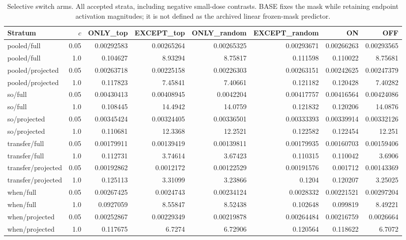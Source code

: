 \begin{table}[!ht]\centering\scriptsize
\setlength{\tabcolsep}{3pt}
\begin{tabular}{lrrrrrrr}\toprule
Stratum & $c$ & ONLY\_top & EXCEPT\_top & ONLY\_random & EXCEPT\_random & ON & OFF\\\midrule
pooled/full & 0.05 & 0.00292583 & 0.00265264 & 0.00265325 & 0.00293671 & 0.00266263 & 0.00293565\\
pooled/full & 1.0 & 0.104627 & 8.93294 & 8.75817 & 0.111598 & 0.110022 & 8.75681\\
pooled/projected & 0.05 & 0.00263718 & 0.00225158 & 0.00226303 & 0.00263151 & 0.00242625 & 0.00247379\\
pooled/projected & 1.0 & 0.117823 & 7.45841 & 7.40661 & 0.121182 & 0.120428 & 7.40282\\
so/full & 0.05 & 0.00430413 & 0.00408945 & 0.0042204 & 0.00417757 & 0.00416564 & 0.00424086\\
so/full & 1.0 & 0.108445 & 14.4942 & 14.0759 & 0.121832 & 0.120206 & 14.0876\\
so/projected & 0.05 & 0.00345424 & 0.00324405 & 0.00336501 & 0.00333393 & 0.00339914 & 0.00332126\\
so/projected & 1.0 & 0.110681 & 12.3368 & 12.2521 & 0.122582 & 0.122454 & 12.251\\
transfer/full & 0.05 & 0.00179911 & 0.00139419 & 0.00139811 & 0.00179935 & 0.00160703 & 0.00159406\\
transfer/full & 1.0 & 0.112731 & 3.74614 & 3.67423 & 0.110315 & 0.110042 & 3.6906\\
transfer/projected & 0.05 & 0.00192862 & 0.0012172 & 0.00122529 & 0.00191576 & 0.001712 & 0.00143369\\
transfer/projected & 1.0 & 0.125113 & 3.31099 & 3.23866 & 0.1204 & 0.120207 & 3.25025\\
when/full & 0.05 & 0.00267425 & 0.0024743 & 0.00234124 & 0.0028332 & 0.00221521 & 0.00297204\\
when/full & 1.0 & 0.0927059 & 8.55847 & 8.52438 & 0.102648 & 0.099819 & 8.49221\\
when/projected & 0.05 & 0.00252867 & 0.00229349 & 0.00219878 & 0.00264484 & 0.00216759 & 0.0026664\\
when/projected & 1.0 & 0.117675 & 6.7274 & 6.72906 & 0.120564 & 0.118622 & 6.7072\\
\bottomrule\end{tabular}
\caption{Selective switch arms. All accepted strata, including negative small-dose contrasts. BASE fixes the mask while retaining endpoint activation magnitudes; it is not defined as the archived linear frozen-mask predictor.}\end{table}

